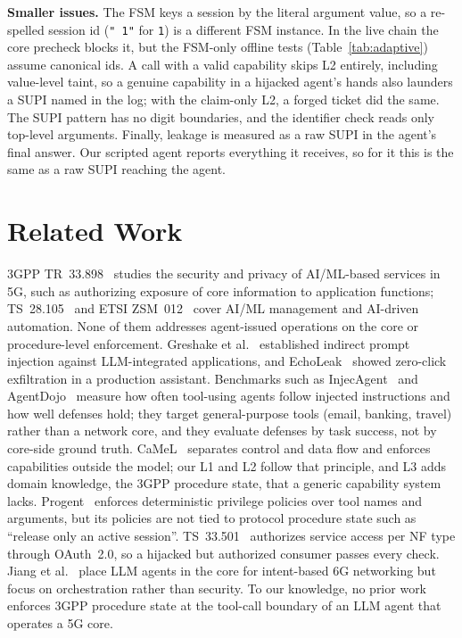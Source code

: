 \documentclass[conference]{IEEEtran}
\newcommand{\code}[1]{\texttt{\small #1}}
\begin{document}
\textbf{Smaller issues.} The FSM keys a session by the literal argument value, so a
re-spelled session id (\code{" 1"} for \code{1}) is a different FSM instance. In the live
chain the core precheck blocks it, but the FSM-only offline tests (Table~\ref{tab:adaptive})
assume canonical ids. A call with a valid capability skips L2 entirely, including value-level
taint, so a genuine capability in a hijacked agent's hands also launders a SUPI named in the
log; with the claim-only L2, a forged ticket did the same. The SUPI pattern has no digit
boundaries, and the identifier check reads only top-level arguments. Finally, leakage is
measured as a raw SUPI in the agent's final answer. Our scripted agent reports everything it
receives, so for it this is the same as a raw SUPI reaching the agent.

\section{Related Work}

3GPP TR~33.898~\cite{tr33898} studies the security and privacy of AI/ML-based services in 5G,
such as authorizing exposure of core information to application functions; TS~28.105~\cite{ts28105}
and ETSI ZSM~012~\cite{zsm012} cover AI/ML management and AI-driven automation. None of them
addresses agent-issued operations on the core or procedure-level enforcement. Greshake
et al.~\cite{greshake2023} established indirect prompt injection against LLM-integrated
applications, and EchoLeak~\cite{echoleak2025} showed zero-click exfiltration in a production
assistant. Benchmarks such as InjecAgent~\cite{injecagent2024} and AgentDojo~\cite{agentdojo2024}
measure how often tool-using agents follow injected instructions and how well defenses hold;
they target general-purpose tools (email, banking, travel) rather than a network core, and they
evaluate defenses by task success, not by core-side ground truth. CaMeL~\cite{camel2025} separates control and data flow and enforces capabilities
outside the model; our L1 and L2 follow that principle, and L3 adds domain knowledge, the
3GPP procedure state, that a generic capability system lacks. Progent~\cite{progent2025}
enforces deterministic privilege policies over tool names and arguments, but its policies
are not tied to protocol procedure state such as ``release only an active session''.
TS~33.501~\cite{ts33501} authorizes service access per NF type through OAuth~2.0, so a
hijacked but authorized consumer passes every check. Jiang et
al.~\cite{jiang2026} place LLM agents in the core for intent-based 6G networking but focus on
orchestration rather than security. To our knowledge, no prior work enforces 3GPP procedure
state at the tool-call boundary of an LLM agent that operates a 5G core.
\end{document}
